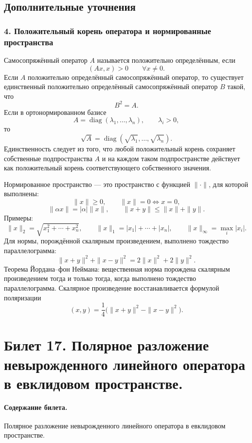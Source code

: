 \documentclass[12pt,a4paper]{article}
\theoremstyle{definition}
\theoremstyle{plain}
\theoremstyle{remark}
\newcommand{\diag}{\operatorname{diag}}
\begin{document}
\subsection*{Дополнительные уточнения}

\subsubsection*{4. Положительный корень оператора и нормированные пространства}
Самосопряжённый оператор $A$ называется положительно определённым, если
\[
    (Ax,x)>0\qquad \forall x\ne0.
\]
Если $A$ положительно определённый самосопряжённый оператор, то существует единственный положительно определённый самосопряжённый оператор $B$ такой, что
\[
    B^2=A.
\]
Если в ортонормированном базисе
\[
    A=\diag(\lambda_1,\ldots,\lambda_n),\qquad \lambda_i>0,
\]
то
\[
    \sqrt A=\diag(\sqrt{\lambda_1},\ldots,\sqrt{\lambda_n}).
\]
Единственность следует из того, что любой положительный корень сохраняет собственные подпространства $A$ и на каждом таком подпространстве действует как положительный корень соответствующего собственного значения.

Нормированное пространство --- это пространство с функцией $\|\cdot\|$, для которой выполнены:
\[
    \|x\|\ge0,
    \qquad
    \|x\|=0\Longleftrightarrow x=0,
\]
\[
    \|\alpha x\|=|\alpha|\|x\|,
    \qquad
    \|x+y\|\le \|x\|+\|y\|.
\]
Примеры:
\[
    \|x\|_2=\sqrt{x_1^2+\cdots+x_n^2},
    \qquad
    \|x\|_1=|x_1|+\cdots+|x_n|,
    \qquad
    \|x\|_\infty=\max_i |x_i|.
\]
Для нормы, порождённой скалярным произведением, выполнено тождество параллелограмма:
\[
    \|x+y\|^2+\|x-y\|^2=2\|x\|^2+2\|y\|^2.
\]
Теорема Йордана--фон Неймана: вещественная норма порождена скалярным произведением тогда и только тогда, когда выполнено тождество параллелограмма. Скалярное произведение восстанавливается формулой поляризации
\[
    (x,y)=\frac{1}{4}\bigl(\|x+y\|^2-\|x-y\|^2\bigr).
\]

\clearpage

\section{Билет 17. Полярное разложение невырожденного линейного оператора в евклидовом пространстве.}

\paragraph{Содержание билета.} Полярное разложение невырожденного линейного оператора в евклидовом пространстве.
\end{document}
